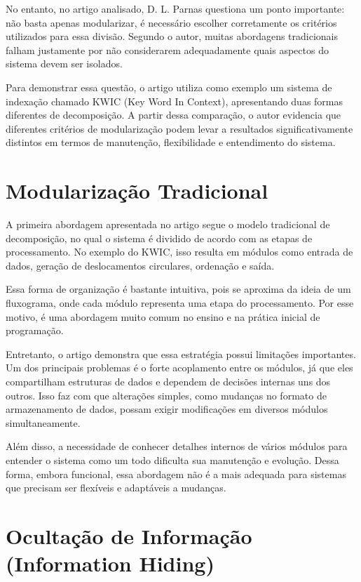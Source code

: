 \documentclass[conference]{IEEEtran}
\begin{document}
No entanto, no artigo analisado, D. L. Parnas questiona um ponto importante: não basta apenas modularizar, é necessário escolher corretamente os critérios utilizados para essa divisão. Segundo o autor, muitas abordagens tradicionais falham justamente por não considerarem adequadamente quais aspectos do sistema devem ser isolados.

Para demonstrar essa questão, o artigo utiliza como exemplo um sistema de indexação chamado KWIC (Key Word In Context), apresentando duas formas diferentes de decomposição. A partir dessa comparação, o autor evidencia que diferentes critérios de modularização podem levar a resultados significativamente distintos em termos de manutenção, flexibilidade e entendimento do sistema.

\section{Modularização Tradicional}

A primeira abordagem apresentada no artigo segue o modelo tradicional de decomposição, no qual o sistema é dividido de acordo com as etapas de processamento. No exemplo do KWIC, isso resulta em módulos como entrada de dados, geração de deslocamentos circulares, ordenação e saída.

Essa forma de organização é bastante intuitiva, pois se aproxima da ideia de um fluxograma, onde cada módulo representa uma etapa do processamento. Por esse motivo, é uma abordagem muito comum no ensino e na prática inicial de programação.

Entretanto, o artigo demonstra que essa estratégia possui limitações importantes. Um dos principais problemas é o forte acoplamento entre os módulos, já que eles compartilham estruturas de dados e dependem de decisões internas uns dos outros. Isso faz com que alterações simples, como mudanças no formato de armazenamento de dados, possam exigir modificações em diversos módulos simultaneamente.

Além disso, a necessidade de conhecer detalhes internos de vários módulos para entender o sistema como um todo dificulta sua manutenção e evolução. Dessa forma, embora funcional, essa abordagem não é a mais adequada para sistemas que precisam ser flexíveis e adaptáveis a mudanças.

\section{Ocultação de Informação (Information Hiding)}
\end{document}

